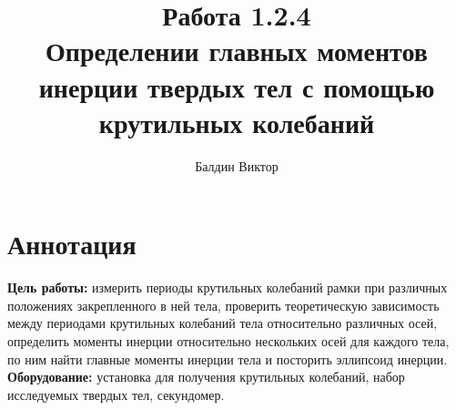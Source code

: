 \documentclass[a4paper, 12pt]{article}
\author{Балдин Виктор}
\title{Работа 1.2.4 \\ Определении главных моментов инерции твердых тел с помощью крутильных колебаний}
\begin{document}
	\maketitle
	\section{Аннотация}
	\textbf{Цель работы:} измерить периоды крутильных колебаний рамки при различных положениях закрепленного
	в ней тела, проверить теоретическую зависимость между периодами крутильных колебаний тела
	относительно различных осей, определить моменты инерции относительно нескольких осей для каждого тела,
	по ним найти главные моменты инерции тела и посторить эллипсоид инерции.
	\bigskip\\
	\textbf{Оборудование:} установка для получения крутильных колебаний, набор исследуемых твердых тел, секундомер.
\end{document}
